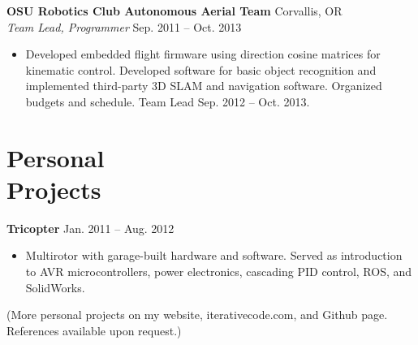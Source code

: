 \documentclass[10pt,letterpaper,margin]{res}
\begin{document}
\begin{resume}
{\bf OSU Robotics Club Autonomous Aerial Team} \hfill {\color{lightgray} Corvallis, OR} \\
{\it Team Lead, Programmer} \hfill {\color{lightgray} Sep. 2011 -- Oct. 2013}\vspace{0.0em}

\begin{itemize}
	\item Developed embedded flight firmware using direction cosine matrices
		for kinematic control. Developed software for basic object recognition
		and implemented third-party 3D SLAM and navigation software.  Organized
		budgets and schedule. Team Lead Sep. 2012 -- Oct. 2013.
\end{itemize}



\section{Personal \\ Projects}

{\bf Tricopter} \hfill {\color{lightgray} Jan. 2011 -- Aug. 2012}\vspace{0.0em}

\begin{itemize}
	\item Multirotor with garage-built hardware and software. Served as
		introduction to AVR microcontrollers, power electronics, cascading PID
		control, ROS, and SolidWorks.
\end{itemize}

{\footnotesize (More personal projects on my website, iterativecode.com, and
Github page. References available upon request.)}


% 

\end{resume}
\end{document}
